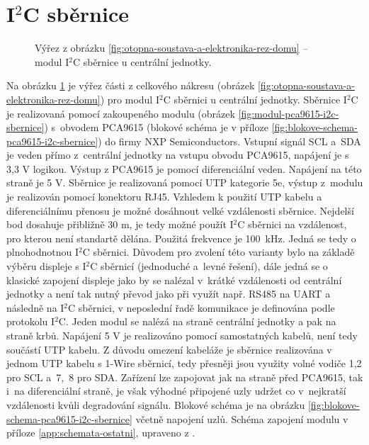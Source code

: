 \section{I$^2$C sběrnice}
\label{sec:i2c-sbernice}

\begin{figure}[H]
   \centering
    \def\svgwidth{0.3\columnwidth}
   
    \caption[Výřez pro modul I$^2$C sběrnice u centrální jednotky.]{Výřez z obrázku \ref{fig:otopna-soustava-a-elektronika-rez-domu} – modul I$^2$C sběrnice u centrální jednotky.}
    \label{fig:vyrez-i2c-sbernice}
\end{figure}

Na obrázku \ref{fig:vyrez-i2c-sbernice} je výřez části z celkového nákresu (obrázek \ref{fig:otopna-soustava-a-elektronika-rez-domu}) pro modul I$^2$C sběrnici u centrální jednotky. Sběrnice I$^2$C je realizovaná pomocí zakoupeného modulu (obrázek \ref{fig:modul-pca9615-i2c-sbernice}) s~obvodem PCA9615 \cite{vyrobce-pca9615} (blokové schéma je v příloze \ref{fig:blokove-schema-pca9615-i2c-sbernice}) do firmy  NXP Semiconductors. Vstupní signál SCL a~SDA je veden přímo z~centrální jednotky na vstupu obvodu PCA9615, napájení je s 3,3 V logikou. Výstup z PCA9615 je pomocí diferenciální veden. Napájení na této straně je 5 V. Sběrnice je realizovaná pomocí UTP kategorie 5e, výstup z~modulu je realizován pomocí konektoru RJ45. Vzhledem k použití UTP kabelu a diferenciálnímu přenosu je možné dosáhnout velké vzdálenosti sběrnice. Nejdelší bod dosahuje přibližně 30 m, je tedy možné použít I$^2$C sběrnici na vzdálenost, pro kterou není standartě dělána. Použitá frekvence je 100~kHz. Jedná se tedy o plnohodnotnou I$^2$C sběrnici. Důvodem pro zvolení této varianty bylo na základě výběru displeje s I$^2$C sběrnicí (jednoduché a~levné řešení), dále jedná se o klasické zapojení displeje jako by se nalézal v~krátké vzdálenosti od centrální jednotky a není tak nutný převod jako při využít např. RS485 na UART a následně na I$^2$C sběrnici, v neposlední řadě komunikace je definována podle protokolu I$^2$C.  Jeden modul se nalézá na straně centrální jednotky a pak na straně krbů. Napájení 5 V je realizováno pomocí samostatných kabelů, není tedy součástí UTP kabelu. Z důvodu omezení kabeláže je sběrnice realizována v jednom UTP kabelu s 1-Wire sběrnicí, tedy přesněji jsou využity volné vodiče 1,2 pro SCL a~7,~8 pro SDA. Zařízení lze zapojovat jak na straně před PCA9615, tak i~na diferenciální straně, je však výhodné připojené uzly udržet co v~nejkratší vzdálenosti kvůli degradování signálu. Blokové schéma je na obrázku \ref{fig:blokove-schema-pca9615-i2c-sbernice} včetně napojení uzlů. Schéma zapojení modulu v příloze \ref{app:schemata-ostatni}, upraveno z \cite{pca9615-schema-zapojeni}.


